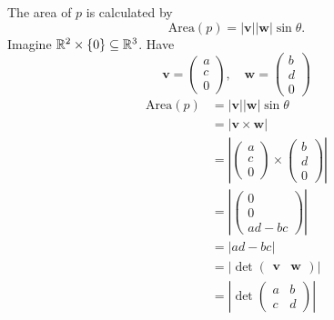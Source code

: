\documentclass[10pt, a4paper]{article}
\newcommand{\mbf}[1]{\mathbf{#1}}
\begin{document}
The area of $p$ is calculated by
\[
\mathrm{Area}(p) = |\mbf{v}||\mbf{w}|\sin\theta.
\]
Imagine $\mathbb{R} ^ 2 \times \{0\} \subseteq \mathbb{R} ^ 3$.
Have
\[
\mbf{v} = \begin{pmatrix}
    a \\ c \\ 0
\end{pmatrix},
\quad
\mbf{w} = \begin{pmatrix}
    b \\ d \\ 0
\end{pmatrix}
\]
\begin{align*}
    \mathrm{Area}(p) &= |\mbf{v}||\mbf{w}|\sin\theta \\
    &= |\mbf{v \times w}| \\
    &= \left|\begin{pmatrix}
        a \\ c \\ 0
    \end{pmatrix} \times \begin{pmatrix}
        b \\ d \\ 0
    \end{pmatrix}\right| \\
    &=
    \left|\begin{pmatrix}
        0 \\ 0 \\ ad - bc
    \end{pmatrix}\right| \\
    &= |ad - bc| \\
    &= \left|\det\begin{pmatrix}
        \mbf{v} & \mbf{w}
    \end{pmatrix}\right| \\
    &= \left|\det\begin{pmatrix}
        a & b \\ c & d
    \end{pmatrix}\right|
\end{align*}
\end{document}
